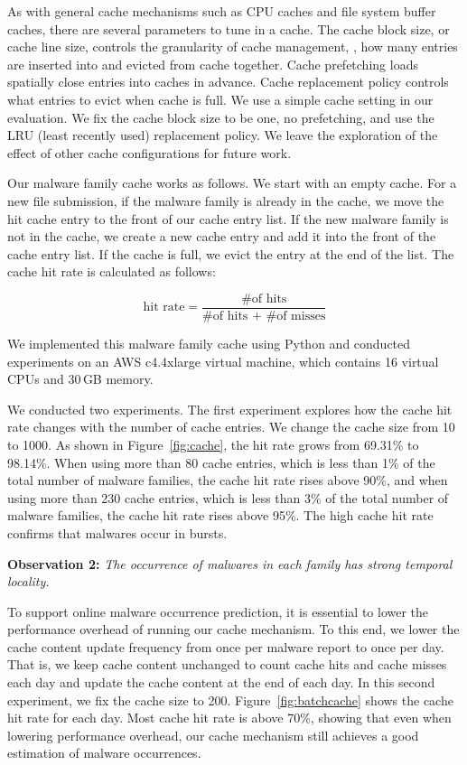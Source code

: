 As with general cache mechanisms such as CPU caches and file system buffer caches, 
there are several parameters to tune in a cache.
The cache block size, or cache line size, controls the granularity of cache management, 
\ie, how many entries are inserted into and evicted from cache together.
Cache prefetching loads spatially close entries into caches in advance. 
Cache replacement policy controls what entries to evict when cache is full.
We use a simple cache setting in our evaluation. 
We fix the cache block size to be one, no prefetching, 
and use the LRU (least recently used) replacement policy.
We leave the exploration of the effect of other cache configurations for future work. 

Our malware family cache works as follows.
We start with an empty cache. 
For a new file submission, if the malware family is already in the cache, 
we move the hit cache entry to the front of our cache entry list. 
If the new malware family is not in the cache, 
we create a new cache entry and add it into the front of the cache entry list.
If the cache is full, we evict the entry at the end of the list. 
The cache hit rate is calculated as follows: 

$$ \mbox{hit rate} = \dfrac{\mbox{\# of hits}}{\mbox{\# of hits + \# of misses}}$$

We implemented this malware family cache using Python
and conducted experiments on an AWS c4.4xlarge virtual machine, 
which contains 16 virtual CPUs and 30\,GB memory.

We conducted two experiments. 
The first experiment explores how the cache hit rate changes with the number of cache entries. 
We change the cache size from 10 to 1000. 
As shown in Figure~\ref{fig:cache}, the hit rate grows from 69.31\% to 98.14\%. 
When using more than 80 cache entries, which is less than 1\% of the total number of malware families, the cache hit rate rises above 90\%, 
and when using more than 230 cache entries, which is less than 3\% of the total number of malware families, 
the cache hit rate rises above 95\%. 
The high cache hit rate confirms that malwares occur in bursts.

{\bf Observation 2:} 
{\em The occurrence of malwares in each family has strong temporal locality.}  

To support online malware occurrence prediction, it is essential to lower the 
performance overhead of running our cache mechanism.
To this end, we lower the cache content update frequency from once per malware report to once per day.
That is, we keep cache content unchanged to count cache hits and cache misses each day and update the cache content at the end of each day.
In this second experiment, we fix the cache size to 200. 
Figure~\ref{fig:batchcache} shows the cache hit rate for each day. 
Most cache hit rate is above 70\%,
showing that even when lowering performance overhead, 
our cache mechanism still achieves a good estimation of malware occurrences.   

